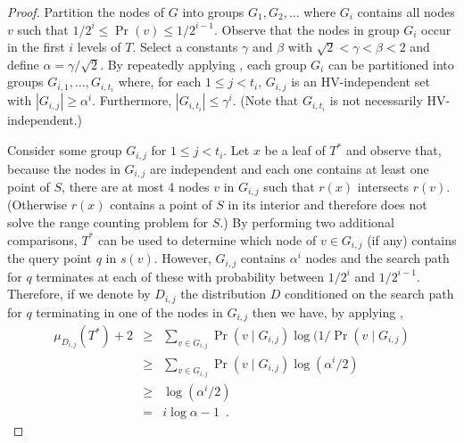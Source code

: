 \documentclass[lotsofwhite,charterfonts]{patmorin}
\begin{document}
\begin{proof}
Partition the nodes of $G$ into groups $G_1,G_2,\ldots$ where $G_i$
contains all nodes $v$ such that $1/2^{i} \le \Pr(v) \le 1/2^{i-1}$.
Observe that the nodes in group $G_i$ occur in the first $i$ levels of
$T$.  Select a constants $\gamma$ and $\beta$ with $\sqrt{2} < \gamma
< \beta < 2$ and define $\alpha=\gamma/\sqrt{2}$.  By
repeatedly applying , each group $G_i$ can be
partitioned into groups $G_{i,1},\ldots,G_{i,t_i}$ where, for each $1
\le j < t_i$, $G_{i,j}$ is an HV-independent set with $|G_{i,j}|
\ge \alpha^i$.  Furthermore, $|G_{i,t_i}| \le \gamma^i$. (Note that
$G_{i,t_i}$ is not necessarily HV-independent.)

Consider some group $G_{i,j}$ for $1\le j < t_i$.  Let $x$ be a leaf
of $T^*$ and observe that, because the nodes in $G_{i,j}$ are
independent and each one contains at least one point of $S$, there are
at most 4 nodes $v$ in $G_{i,j}$ such that $r(x)$ intersects $r(v)$.
(Otherwise $r(x)$ contains a point of $S$ in its interior and
therefore does not solve the range counting problem for $S$.)
By performing two additional comparisons, $T^*$ can be used to
determine which node of $v\in G_{i,j}$ (if any) contains the query point
$q$ in $s(v)$.  
However, $G_{i,j}$ contains $\alpha^i$ nodes and the search path
for $q$ terminates at each of these with probability between $1/2^i$
and $1/2^{i-1}$.
Therefore, if we denote by $D_{i,j}$ the distribution $D$ conditioned
on the search path for $q$ terminating in one of the nodes in
$G_{i,j}$ then we have, by applying ,
\begin{eqnarray*}
   \mu_{D_{i,j}}(T^*) + 2 
    & \ge & \sum_{v\in G_{i,j}}\Pr(v\mid G_{i,j})\log(1/\Pr(v\mid G_{i,j}) \\
    & \ge & \sum_{v\in G_{i,j}}\Pr(v\mid G_{i,j})\log(\alpha^i/2) \\
    & \ge & \log(\alpha^i/2) \\
    & = & i\log\alpha - 1 \enspace .
\end{eqnarray*}


\end{proof}
\end{document}
